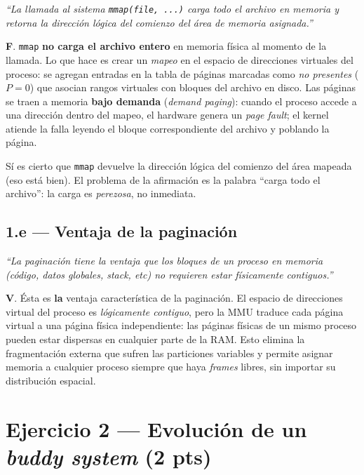 \documentclass[11pt,a4paper]{article}
\begin{document}
\emph{``La llamada al sistema \texttt{mmap(file, ...)} carga todo el
archivo en memoria y retorna la dirección lógica del comienzo del
área de memoria asignada.''}

\begin{respuesta}
\textbf{F}. \texttt{mmap} \textbf{no carga el archivo entero} en
memoria física al momento de la llamada. Lo que hace es crear un
\emph{mapeo} en el espacio de direcciones virtuales del proceso: se
agregan entradas en la tabla de páginas marcadas como
\emph{no presentes} ($P=0$) que asocian rangos virtuales con bloques
del archivo en disco. Las páginas se traen a memoria \textbf{bajo
demanda} (\emph{demand paging}): cuando el proceso accede a una
dirección dentro del mapeo, el hardware genera un \emph{page fault};
el kernel atiende la falla leyendo el bloque correspondiente del
archivo y poblando la página.

Sí es cierto que \texttt{mmap} devuelve la dirección lógica del
comienzo del área mapeada (eso está bien). El problema de la
afirmación es la palabra ``carga todo el archivo'': la carga es
\emph{perezosa}, no inmediata.
\end{respuesta}

\subsection*{1.e --- Ventaja de la paginación}

\emph{``La paginación tiene la ventaja que los bloques de un proceso
en memoria (código, datos globales, stack, etc) no requieren estar
físicamente contiguos.''}

\begin{respuesta}
\textbf{V}. Ésta es \textbf{la} ventaja característica de la
paginación. El espacio de direcciones virtual del proceso es
\emph{lógicamente contiguo}, pero la MMU traduce cada página virtual
a una página física independiente: las páginas físicas de un mismo
proceso pueden estar dispersas en cualquier parte de la RAM. Esto
elimina la fragmentación externa que sufren las particiones
variables y permite asignar memoria a cualquier proceso siempre que
haya \emph{frames} libres, sin importar su distribución espacial.
\end{respuesta}

\section{Ejercicio 2 --- Evolución de un \emph{buddy system} (2 pts)}
\end{document}
